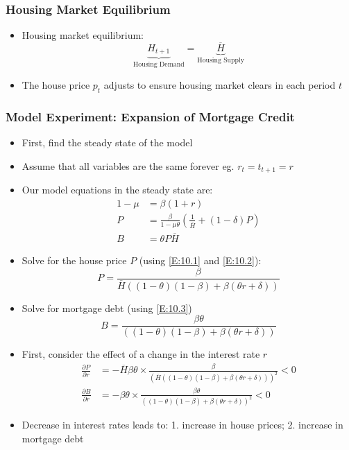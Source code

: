 \documentclass{article}
\numberwithin{equation}{section}
\numberwithin{figure}{section}
\begin{document}
\subsubsection{Housing Market Equilibrium}
	\begin{itemize}
		\item Housing market equilibrium:
		\[
			\underbrace{H_{t+1}}_\text{Housing Demand} = \underbrace{\overline{H}}_\text{Housing Supply}
		\]
		\item The house price \( p_t \) adjusts to ensure housing market clears in each period \( t \)
	\end{itemize}
\subsubsection{Model Experiment: Expansion of Mortgage Credit}
	\begin{itemize}
		\item First, find the \textcolor{myblue}{steady state} of the model
		\item Assume that all variables are the same forever eg. \( r_t=t_{t+1}=r \)
		\item Our model equations in the steady state are:
		\begin{align}
			1-\mu &= \beta(1+r) \label{E:10.1}\\
			P &= \frac{\beta}{1-\mu\theta} \left( \frac{1}{\overline{H}} + (1-\delta)P \right) \label{E:10.2}\\
			B &= \theta P\overline{H} \label{E:10.3}
		\end{align}
		\item Solve for the house price \( P \) (using \cref{E:10.1} and \cref{E:10.2}):
		\[
			P = \frac{\beta}{\overline{H}((1-\theta)(1-\beta)+\beta(\theta r+\delta))}
		\]
		\item Solve for mortgage debt (using \cref{E:10.3})
		\[
			B = \frac{\beta\theta}{((1-\theta)(1-\beta)+\beta(\theta r+\delta))}
		\]
		\item First, consider the effect of a \textcolor{myblue}{change in the interest rate \( \mathit{r} \)}
		\begin{align*}
			\frac{\partial P}{\partial r} &= -\overline{H}\beta\theta \times \frac{\beta}{(\overline{H}((1-\theta)(1-\beta)+\beta(\theta r+\delta)))^2} <0\\
			\frac{\partial B}{\partial r} &= -\beta\theta \times \frac{\beta\theta}{((1-\theta)(1-\beta)+\beta(\theta r+\delta))^2} <0
		\end{align*}
		\item Decrease in interest rates leads to: 1. \textcolor{myblue}{increase in house prices}; 2. \textcolor{myblue}{increase in mortgage debt}

\end{itemize}
\end{document}
